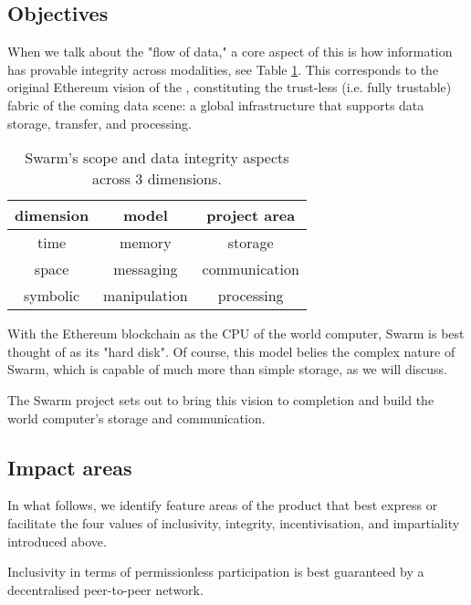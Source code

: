 \subsection{Objectives \statusyellow}\label{sec:objectives}


When we talk about the "flow of data," a core aspect of this is how information has provable integrity across modalities, see Table \ref{tab:scope}. This corresponds to the original Ethereum vision of the ,  constituting the trust-less (i.e. fully trustable) fabric of the coming data scene: a global infrastructure that supports data storage, transfer, and processing.

\begin{table}[!htb]
\centering
\begin{tabular}{c|c|c}
dimension & model & project area\\\hline
%
time & memory & storage \\
space & messaging & communication \\
symbolic & manipulation & processing \\
\end{tabular}
\caption{Swarm's scope and data integrity aspects across 3 dimensions.}
\label{tab:scope}
\end{table}

 
With the Ethereum blockchain as the CPU of the world computer, Swarm is best thought of as its "hard disk". Of course, this model belies the complex nature of Swarm, which is capable of much more than simple storage, as we will discuss.

The Swarm project sets out to bring this vision to completion and build the world computer's storage and communication. 

\subsection{Impact areas \statusorange}

In what follows, we identify feature areas of the product that best express or facilitate the four values of inclusivity, integrity, incentivisation, and impartiality introduced above. 

Inclusivity in terms of permissionless participation is best guaranteed by a decentralised peer-to-peer network.  

